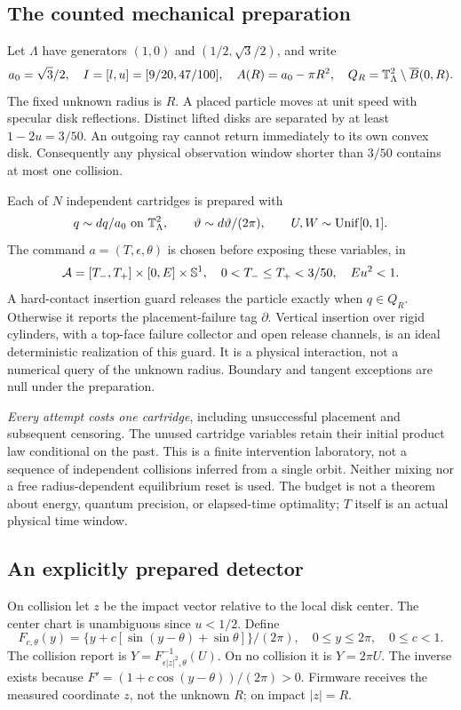 \subsection{The counted mechanical preparation}
Let $\Lambda$ have generators $(1,0)$ and $(1/2,\sqrt3/2)$, and write
\[
 a_0=\sqrt3/2,\quad I=[l,u]=[9/20,47/100],\quad
 A(R)=a_0-\pi R^2,\quad Q_R=\mathbb T^2_\Lambda\setminus\overline B(0,R).
\]
The fixed unknown radius is $R$. A placed particle moves at unit speed with specular disk reflections. Distinct lifted disks are separated by at least $1-2u=3/50$. An outgoing ray cannot return immediately to its own convex disk. Consequently any physical observation window shorter than $3/50$ contains at most one collision.

Each of $N$ independent cartridges is prepared with
\begin{equation}
 q\sim dq/a_0\text{ on }\mathbb T^2_\Lambda,\qquad
 \vartheta\sim d\vartheta/(2\pi),\qquad U,W\sim\mathrm{Unif}[0,1].
 \label{eq:preparation}
\end{equation}
The command $a=(T,\epsilon,\theta)$ is chosen before exposing these variables, in
\[
 \mathcal A=[T_-,T_+]\times[0,E]\times\mathbb S^1,
 \quad 0<T_-\le T_+<3/50,\quad Eu^2<1.
\]
A hard-contact insertion guard releases the particle exactly when $q\in Q_R$. Otherwise it reports the placement-failure tag $\partial$. Vertical insertion over rigid cylinders, with a top-face failure collector and open release channels, is an ideal deterministic realization of this guard. It is a physical interaction, not a numerical query of the unknown radius. Boundary and tangent exceptions are null under the preparation.

\emph{Every attempt costs one cartridge}, including unsuccessful placement and subsequent censoring. The unused cartridge variables retain their initial product law conditional on the past. This is a finite intervention laboratory, not a sequence of independent collisions inferred from a single orbit. Neither mixing nor a free radius-dependent equilibrium reset is used. The budget is not a theorem about energy, quantum precision, or elapsed-time optimality; $T$ itself is an actual physical time window.

\subsection{An explicitly prepared detector}
On collision let $z$ be the impact vector relative to the local disk center. The center chart is unambiguous since $u<1/2$. Define
\[
 F_{c,\theta}(y)=\{y+c[\sin(y-\theta)+\sin\theta]\}/(2\pi),
 \quad 0\le y\le2\pi,\quad 0\le c<1.
\]
The collision report is $Y=F^{-1}_{\epsilon|z|^2,\theta}(U)$. On no collision it is $Y=2\pi U$. The inverse exists because $F'=(1+c\cos(y-\theta))/(2\pi)>0$. Firmware receives the measured coordinate $z$, not the unknown $R$; on impact $|z|=R$.

